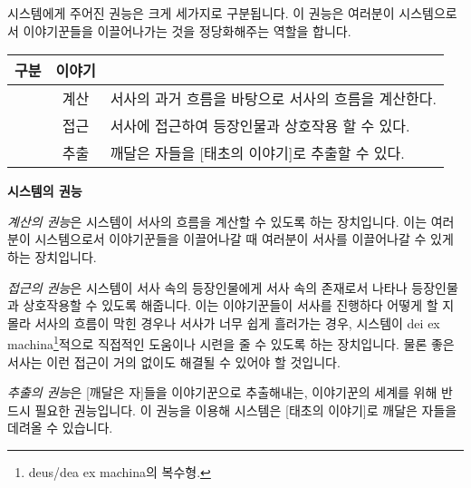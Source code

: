 \documentclass{report}
\begin{document}
	\bigskip
	
	시스템에게 주어진 권능은 크게 세가지로 구분됩니다. 이 권능은 여러분이 시스템으로서 이야기꾼들을 이끌어나가는 것을 정당화해주는 역할을 합니다.
	
	\smallskip
	
	\begin{minipage}{\textwidth}
		\begin{tabularx}{\textwidth}{c!{\color{black}\vrule}c!{\color{black}\vrule}X}
			\hline
			\textbf{구분} & \textbf{이야기} &  \\ \hline \hline
			[권능:시스템] & 계산 & 서사의 과거 흐름을 바탕으로 서사의 흐름을 계산한다. \\ \hline
			[권능:시스템] & 접근 & 서사에 접근하여 등장인물과 상호작용 할 수 있다. \\ \hline
			[권능:시스템] & 추출 & 깨달은 자들을 [태초의 이야기]로 추출할 수 있다. \\ \hline
		\end{tabularx}
		
		\smallskip
		
		\begin{tightcenter}
			\textbf{시스템의 권능}
		\end{tightcenter}
	\end{minipage}
	
	\bigskip
	
	\emph{계산의 권능}은 시스템이 서사의 흐름을 계산할 수 있도록 하는 장치입니다. 이는 여러분이 시스템으로서 이야기꾼들을 이끌어나갈 때 여러분이 서사를 이끌어나갈 수 있게 하는 장치입니다.
	
	\smallskip
	
	\emph{접근의 권능}은 시스템이 서사 속의 등장인물에게 서사 속의 존재로서 나타나 등장인물과 상호작용할 수 있도록 해줍니다. 이는 이야기꾼들이 서사를 진행하다 어떻게 할 지 몰라 서사의 흐름이 막힌 경우나 서사가 너무 쉽게 흘러가는 경우, 시스템이 dei ex machina\footnote{deus/dea ex machina의 복수형.}적으로 직접적인 도움이나 시련을 줄 수 있도록 하는 장치입니다. 물론 좋은 서사는 이런 접근이 거의 없이도 해결될 수 있어야 할 것입니다.
	
	\smallskip
	
	\emph{추출의 권능}은 [깨달은 자]들을 이야기꾼으로 추출해내는, 이야기꾼의 세계를 위해 반드시 필요한 권능입니다. 이 권능을 이용해 시스템은 [태초의 이야기]로 깨달은 자들을 데려올 수 있습니다.
\end{document}
